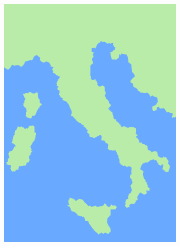 \documentclass{beamer}
\begin{document}
\begin{frame}
\begin{figure}
\begin{subfigure}[b]{0.3\textwidth}
        \end{subfigure}
    \hfill
        \begin{subfigure}[b]{0.3\textwidth}
        \centering
         \includegraphics[width=\textwidth]{images/italy3.png}
         

\end{subfigure}
\end{figure}
\end{frame}
\end{document}
